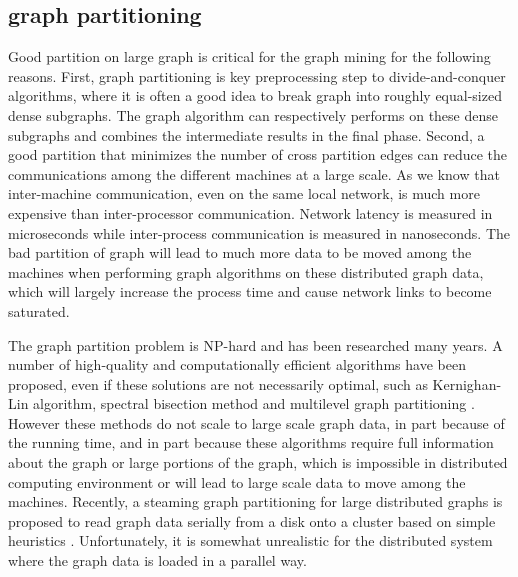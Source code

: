 \documentclass{acm_proc_article-sp}
\begin{document}
\subsection{graph partitioning}
 Good partition on large graph is critical for the graph mining for the following reasons. First, graph partitioning is key preprocessing step to divide-and-conquer algorithms, where it is often a good idea to break graph into roughly equal-sized dense subgraphs. The graph algorithm can respectively performs on these dense subgraphs and combines the intermediate results in the final phase. Second, a good partition that minimizes the number of cross partition edges can reduce the communications among the different machines at a large scale. As we know that inter-machine communication, even on the same local network, is much more expensive than inter-processor communication. Network latency is measured in microseconds while inter-process communication is measured in nanoseconds. The bad partition of graph will lead to much more data to be moved among the machines when performing graph algorithms on these distributed graph data, which will largely increase the process time and cause network links to become saturated.
\par
 The graph partition problem is NP-hard and has been researched many years. A number of high-quality and computationally efficient algorithms have been proposed, even if these solutions are not necessarily optimal, such as Kernighan-Lin algorithm, spectral bisection method and multilevel graph partitioning \cite{kl:partition,barnard:mrsb,karypis:multi1}. However these methods do not scale to large scale graph data, in part because of the running time, and in part because these algorithms require full information about the graph or large portions of the graph, which is impossible in distributed computing environment or will lead to large scale data to move among the machines. Recently, a steaming graph partitioning for large distributed graphs is proposed to read graph data serially from a disk onto a cluster based on simple heuristics \cite{url:streaming}. Unfortunately, it is somewhat unrealistic for the distributed system where the graph data is loaded in a parallel way.
\end{document}
